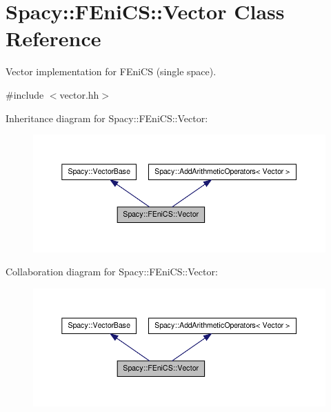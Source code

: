 \hypertarget{classSpacy_1_1FEniCS_1_1Vector}{\section{\-Spacy\-:\-:\-F\-Eni\-C\-S\-:\-:\-Vector \-Class \-Reference}
\label{classSpacy_1_1FEniCS_1_1Vector}
}


\-Vector implementation for \-F\-Eni\-C\-S (single space).  




{\ttfamily \#include $<$vector.\-hh$>$}



\-Inheritance diagram for \-Spacy\-:\-:\-F\-Eni\-C\-S\-:\-:\-Vector\-:
\nopagebreak
\begin{figure}[H]
\begin{center}
\leavevmode
\includegraphics[width=350pt]{classSpacy_1_1FEniCS_1_1Vector__inherit__graph}
\end{center}
\end{figure}


\-Collaboration diagram for \-Spacy\-:\-:\-F\-Eni\-C\-S\-:\-:\-Vector\-:
\nopagebreak
\begin{figure}[H]
\begin{center}
\leavevmode
\includegraphics[width=350pt]{classSpacy_1_1FEniCS_1_1Vector__coll__graph}
\end{center}
\end{figure}
